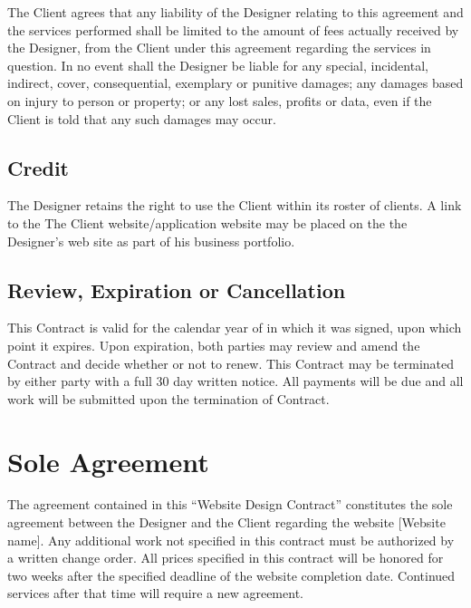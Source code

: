 \documentclass[a4paper,12pt]{article} %
\begin{document}
The Client agrees that any liability of the Designer relating to this agreement and the services performed shall be limited to the amount of fees actually received by the Designer, from the Client under this agreement regarding the services in question. In no event shall the Designer be liable for any special, incidental, indirect, cover, consequential, exemplary or punitive damages; any damages based on injury to person or property; or any lost sales, profits or data, even if the Client is told that any such damages may occur.


\subsection{Credit}

The Designer retains the right to use the Client within its roster of clients. A link to the The Client website/application website may be placed on the the Designer's web site as part of his business portfolio.


\subsection{Review, Expiration or Cancellation}

This Contract is valid for the calendar year of in which it was signed, upon which point it expires. Upon expiration, both parties may review and amend the Contract and decide whether or not to renew. This Contract may be terminated by either party with a full 30 day written notice. All payments will be due and all work will be submitted upon the termination of Contract.


\section{Sole Agreement}

The agreement contained in this ``Website Design Contract'' constitutes the sole agreement between the Designer and the Client regarding the website [Website name]. Any additional work not specified in this contract must be authorized by a written change order. All prices specified in this contract will be honored for two weeks after the specified deadline of the website completion date. Continued services after that time will require a new agreement.
\end{document}
